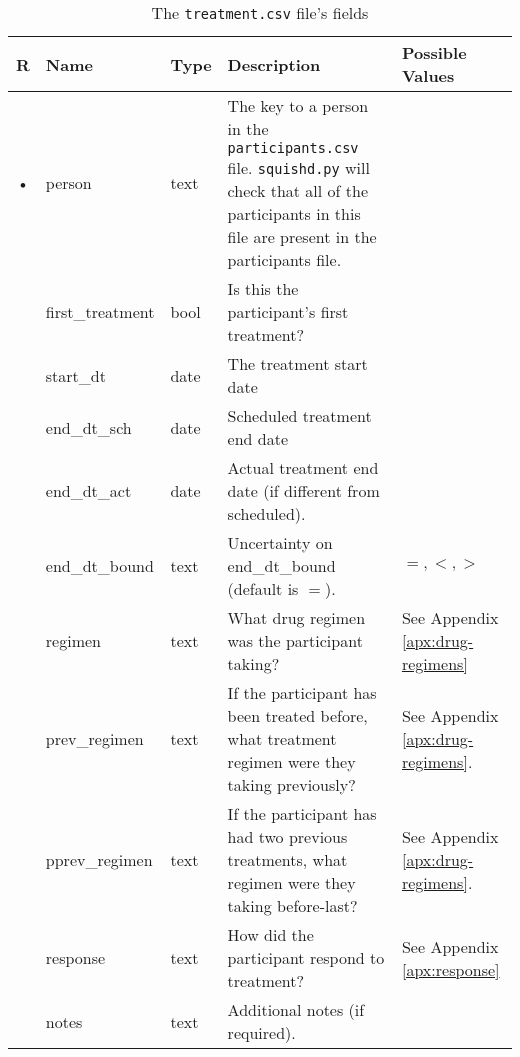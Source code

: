 \documentclass{article}
\begin{document}
\begin{table}[h!]
  \centering
  \caption{The \texttt{treatment.csv} file's fields}
  \label{tbl:treatment.csv}
  \begin{tabular}{cllp{6cm}p{4cm}}
    R & Name                & Type      & Description   & Possible Values\\ \hline
    • & person              & text    & The key to a person in the \texttt{participants.csv}
    file. \texttt{squishd.py} will check that all of the participants in this file
    are present in the participants file. & \\
      & first\_treatment    & bool      & Is this the participant's first treatment? & \\
      & start\_dt           & date      & The treatment start date & \\
      & end\_dt\_sch        & date      & Scheduled treatment end date & \\
      & end\_dt\_act        & date      & Actual treatment end date (if different from scheduled). \\
      & end\_dt\_bound      & text    &
    Uncertainty on end\_dt\_bound (default is $=$). & $=, <, >$ \\
      & regimen             & text      & What drug regimen was the participant taking? & See Appendix \ref{apx:drug-regimens} \\
      & prev\_regimen       & text      & If the participant has been treated before, what treatment regimen were they taking previously?  & See Appendix \ref{apx:drug-regimens}. \\
      & pprev\_regimen      & text      & If the participant has had two previous treatments, what regimen were they taking before-last? & See Appendix \ref{apx:drug-regimens}. \\
      & response            & text      & How did the participant respond to treatment? & See Appendix \ref{apx:response} \\
      & notes               & text    & Additional notes (if required). & \\
  \end{tabular}
\end{table}
\end{document}
